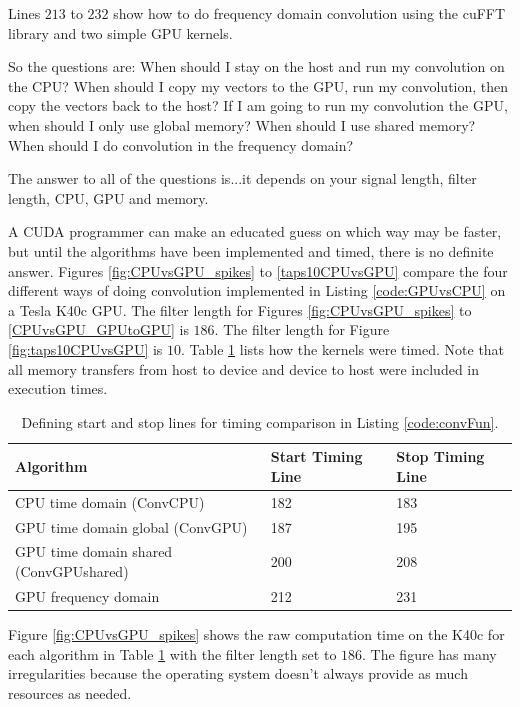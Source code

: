Lines $213$ to $232$ show how to do frequency domain convolution using the cuFFT library and two simple GPU kernels.

So the questions are:
When should I stay on the host and run my convolution on the CPU?
When should I copy my vectors to the GPU, run my convolution, then copy the vectors back to the host?
If I am going to run my convolution the GPU, when should I only use global memory?
When should I use shared memory?
When should I do convolution in the frequency domain?

The answer to all of the questions is...it depends on your signal length, filter length, CPU, GPU and memory.

A CUDA programmer can make an educated guess on which way may be faster, but until the algorithms have been implemented and timed, there is no definite answer.
Figures \ref{fig:CPUvsGPU_spikes} to \ref{taps10CPUvsGPU} compare the four different ways of doing convolution implemented in Listing \ref{code:GPUvsCPU} on a Tesla K40c GPU.
The filter length for Figures \ref{fig:CPUvsGPU_spikes} to \ref{CPUvsGPU_GPUtoGPU} is $186$.
The filter length for Figure \ref{fig:taps10CPUvsGPU} is $10$.
Table \ref{tab:CPUvsGPUtimingTable} lists how the kernels were timed.
Note that all memory transfers from host to device and device to host were included in execution times.
\begin{table}
\caption{Defining start and stop lines for timing comparison in Listing \ref{code:convFun}.}
\begin{center}
\begin{tabular}{lll}
	\toprule
	Algorithm 								& Start Timing Line	& Stop Timing Line	\\ \midrule
	CPU time domain (ConvCPU) 				& 182				& 183 				\\
	GPU time domain global (ConvGPU) 		& 187				& 195				\\
	GPU time domain shared (ConvGPUshared) 	& 200				& 208				\\
	GPU frequency domain 					& 212				& 231				\\ 
	\bottomrule
\end{tabular}
\end{center}
\label{tab:CPUvsGPUtimingTable}
\end{table}

Figure \ref{fig:CPUvsGPU_spikes} shows the raw computation time on the K40c for each algorithm in Table \ref{tab:CPUvsGPUtimingTable} with the filter length set to $186$.
The figure has many irregularities because the operating system doesn't always provide as much resources as needed.

